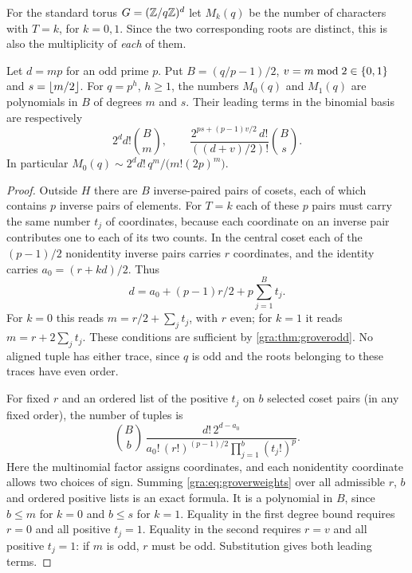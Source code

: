 For the standard torus $G=(\mathbb{Z}/q\mathbb{Z})^d$ let $M_k(q)$ be the number of characters with $T=k$,
for $k=0,1$. Since the two corresponding roots are distinct, this is also the multiplicity
of \emph{each} of them.

\begin{theorem}\label{gra:thm:grovercount}
Let $d=mp$ for an odd prime $p$. Put $B=(q/p-1)/2$, $v=m\bmod2\in\{0,1\}$ and
$s=\lfloor m/2\rfloor$. For $q=p^h$, $h\ge1$, the numbers $M_0(q)$ and $M_1(q)$ are polynomials
in $B$ of degrees $m$ and $s$. Their leading terms in the binomial basis are respectively
\[
 2^d d!\binom Bm,\qquad \frac{2^{ps+(p-1)v/2}\,d!}{((d+v)/2)!}\binom Bs .
\]
In particular $M_0(q)\sim2^dd!\,q^m/\bigl(m!(2p)^m\bigr)$.
\end{theorem}

\begin{proof}
Outside $H$ there are $B$ inverse-paired pairs of cosets, each of which contains $p$
inverse pairs of elements. For $T=k$ each of these $p$ pairs must carry the same number
$t_j$ of coordinates, because each coordinate on an inverse pair contributes one to each of
its two counts. In the central coset each of the $(p-1)/2$ nonidentity inverse pairs carries
$r$ coordinates, and the identity carries $a_0=(r+kd)/2$. Thus
\[
 d=a_0+(p-1)r/2+p\sum_{j=1}^Bt_j .
\]
For $k=0$ this reads $m=r/2+\sum_jt_j$, with $r$ even; for $k=1$ it reads
$m=r+2\sum_jt_j$. These conditions are sufficient by \cref{gra:thm:groverodd}. No aligned
tuple has either trace, since $q$ is odd and the roots belonging to these traces have even
order.

For fixed $r$ and an ordered list of the positive $t_j$ on $b$ selected coset pairs (in
any fixed order), the number of tuples is
\begin{equation}\label{gra:eq:groverweights}
 \binom Bb\,\frac{d!\,2^{d-a_0}}{a_0!\,(r!)^{(p-1)/2}\prod_{j=1}^{b}(t_j!)^{p}} .
\end{equation}
Here the multinomial factor assigns coordinates, and each nonidentity coordinate allows two
choices of sign. Summing \eqref{gra:eq:groverweights} over all admissible $r$, $b$ and
ordered positive lists is an exact formula. It is a polynomial in $B$, since $b\le m$ for
$k=0$ and $b\le s$ for $k=1$. Equality in the first degree bound requires $r=0$ and all
positive $t_j=1$. Equality in the second requires $r=v$ and all positive $t_j=1$: if $m$
is odd, $r$ must be odd. Substitution gives both leading terms.
\end{proof}

